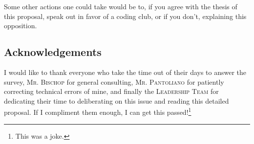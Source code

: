 \documentclass{report}
\begin{document}
Some other actions one could take would be to, if you agree with the thesis of this proposal, speak out in favor of a coding club, or if you don't, explaining this opposition.

\subsection{Acknowledgements}

I would like to thank everyone who take the time out of their days to answer the survey, \textsc{Mr. Bischop} for general consulting, \textsc{Mr. Pantoliano} for patiently correcting technical errors of mine, and finally the \textsc{Leadership Team} for dedicating their time to deliberating on this issue and reading this detailed proposal. If I compliment them enough, I can get this passed!\footnote{This was a joke.}
\end{document}
